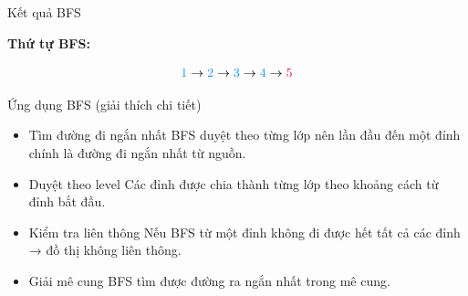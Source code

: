 \documentclass{beamer}
\newcommand{\hlblue}[1]{\textcolor{myblue}{#1}}
\newcommand{\hlgreen}[1]{\textcolor{mygreen}{#1}}
\newcommand{\hlred}[1]{\textcolor{myred}{#1}}
\newcommand{\hlpurple}[1]{\textcolor{mypurple}{#1}}
\newcommand{\hlorange}[1]{\textcolor{myorange}{#1}}
\begin{document}
\begin{frame}{Kết quả BFS}

\begin{center}
\end{center}

\vspace{6pt}

\textbf{Thứ tự BFS:}  

\[
\hlblue{1} \rightarrow \hlblue{2} \rightarrow \hlblue{3} \rightarrow \hlblue{4} \rightarrow \hlred{5}
\]

\end{frame}



\begin{frame}{Ứng dụng BFS (giải thích chi tiết)}

\begin{itemize}

\item \hlblue{Tìm đường đi ngắn nhất}  
BFS duyệt theo từng lớp nên lần đầu đến một đỉnh chính là đường đi ngắn nhất từ nguồn.

\vspace{5pt}

\item \hlgreen{Duyệt theo level}  
Các đỉnh được chia thành từng lớp theo khoảng cách từ đỉnh bắt đầu.

\vspace{5pt}

\item \hlpurple{Kiểm tra liên thông}  
Nếu BFS từ một đỉnh không đi được hết tất cả các đỉnh → đồ thị không liên thông.

\vspace{5pt}

\item \hlorange{Giải mê cung}  
BFS tìm được đường ra ngắn nhất trong mê cung.

\end{itemize}

\end{frame}
\end{document}
